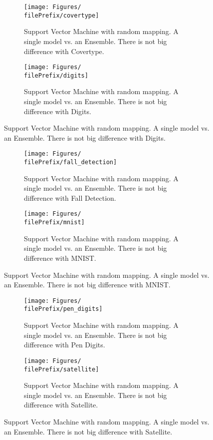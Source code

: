 \renewcommand{\filePrefix}{\undPrefix/aux}
\begin{figure}[H]
  \centering
  \begin{subfigure}[t]{0.5\linewidth}
    \centering\captionsetup{width=.8\linewidth}\texttt{[image: Figures/\\filePrefix/covertype]}
    \caption{Support Vector Machine with random mapping. A single model vs. an Ensemble. There is not big difference with Covertype.}
    \label{2_4:aux}
  \end{subfigure}%
  \begin{subfigure}[t]{0.5\linewidth}
    \centering\captionsetup{width=.8\linewidth}\texttt{[image: Figures/\\filePrefix/digits]}
    \caption{Support Vector Machine with random mapping. A single model vs. an Ensemble. There is not big difference with Digits.}
    \label{fig:\undPrefix_digits}
  \end{subfigure}
\end{figure}


\begin{figure}[H]
  \centering
  \begin{subfigure}[t]{0.5\linewidth}
    \centering\captionsetup{width=.8\linewidth}\texttt{[image: Figures/\\filePrefix/fall\_detection]}
    \caption{Support Vector Machine with random mapping. A single model vs. an Ensemble. There is not big difference with Fall Detection.}
    \label{fig:\undPrefix_fall_detection}
  \end{subfigure}%
  \begin{subfigure}[t]{0.5\linewidth}
    \centering\captionsetup{width=.8\linewidth}\texttt{[image: Figures/\\filePrefix/mnist]}
    \caption{Support Vector Machine with random mapping. A single model vs. an Ensemble. There is not big difference with MNIST.}
    \label{fig:\undPrefix_mnist}
  \end{subfigure}
\end{figure}


\begin{figure}[H]
  \centering
  \begin{subfigure}[t]{0.5\linewidth}
    \centering\captionsetup{width=.8\linewidth}\texttt{[image: Figures/\\filePrefix/pen\_digits]}
    \caption{Support Vector Machine with random mapping. A single model vs. an Ensemble. There is not big difference with Pen Digits.}
    \label{fig:\undPrefix_pen_digits}
  \end{subfigure}%
  \begin{subfigure}[t]{0.5\linewidth}
    \centering\captionsetup{width=.8\linewidth}\texttt{[image: Figures/\\filePrefix/satellite]}
    \caption{Support Vector Machine with random mapping. A single model vs. an Ensemble. There is not big difference with Satellite.}
    \label{fig:\undPrefix_satellite}
  \end{subfigure}
\end{figure}

